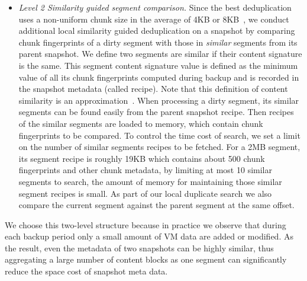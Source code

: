 \begin{itemize}
\item {\em Level 2  Similarity guided segment comparison.}
Since the best deduplication uses a non-uniform chunk size 
in the average of 4KB or 8KB~\cite{Jin2009},
we conduct additional local similarity guided deduplication on a snapshot by comparing
chunk fingerprints of a dirty segment 
with those in  {\em similar} segments from its parent snapshot. 
We define two segments are similar if their content signature is the same.
This segment content signature value is defined as the minimum value of all its chunk fingerprints 
computed during backup and is recorded in the snapshot metadata (called recipe). Note that this definition of
content similarity is an approximation~\cite{resemblance97}.  When processing a dirty segment,
its  similar segments can be found easily from the
parent snapshot recipe.  Then recipes of the similar segments are loaded to memory,
which contain chunk fingerprints to be compared.
To control the time cost of search, we set a limit on the number of  similar segments recipes to be fetched. 
For a 2MB segment, its segment recipe is roughly 19KB which contains about 500 chunk fingerprints and other chunk metadata,
by limiting at most 10 similar segments to search, the amount of memory for maintaining those similar segment recipes is small.
As part of our local duplicate search we also compare the current segment
against the parent segment at the same offset.

\end{itemize}

We choose this two-level structure because in practice we observe that during each backup period only a small amount
of VM data are added or modified. As the result, even the metadata of two snapshots can be highly similar,
thus aggregating a large number of content blocks as one segment can significantly
reduce the space cost of snapshot meta data. 

